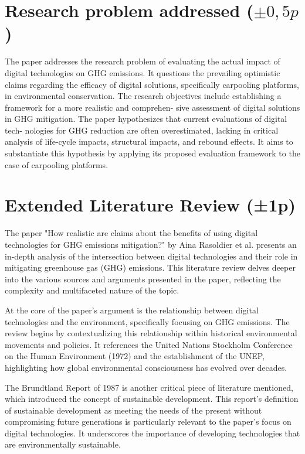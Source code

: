 \documentclass[conference,compsoc]{IEEEtran}
\begin{document}
\section{Research problem addressed ($\pm 0,5p$)}

The paper addresses the research problem of evaluating
the actual impact of digital technologies on GHG emissions.
It questions the prevailing optimistic claims regarding the
efficacy of digital solutions, specifically carpooling platforms,
in environmental conservation. The research objectives include
establishing a framework for a more realistic and comprehen-
sive assessment of digital solutions in GHG mitigation. The
paper hypothesizes that current evaluations of digital tech-
nologies for GHG reduction are often overestimated, lacking
in critical analysis of life-cycle impacts, structural impacts,
and rebound effects. It aims to substantiate this hypothesis
by applying its proposed evaluation framework to the case of
carpooling platforms.


\section{Extended Literature Review (±1p)}

The paper "How realistic are claims about the benefits of using digital technologies for GHG emissions mitigation?" by Aina Rasoldier et al. presents an in-depth analysis of the intersection between digital technologies and their role in mitigating greenhouse gas (GHG) emissions. This literature review delves deeper into the various sources and arguments presented in the paper, reflecting the complexity and multifaceted nature of the topic.

At the core of the paper's argument is the relationship between digital technologies and the environment, specifically focusing on GHG emissions. The review begins by contextualizing this relationship within historical environmental movements and policies. It references the United Nations Stockholm Conference on the Human Environment (1972) and the establishment of the UNEP, highlighting how global environmental consciousness has evolved over decades.

The Brundtland Report of 1987 is another critical piece of literature mentioned, which introduced the concept of sustainable development. This report's definition of sustainable development as meeting the needs of the present without compromising future generations is particularly relevant to the paper's focus on digital technologies. It underscores the importance of developing technologies that are environmentally sustainable.
\end{document}
